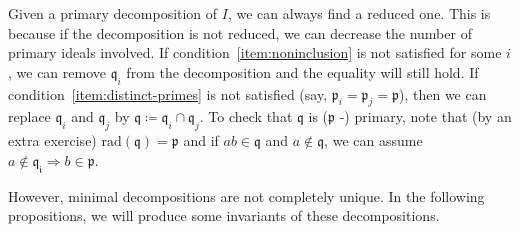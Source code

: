 \begin{rk}
    Given a primary decomposition of $I$, we can always find a reduced one.
    This is because if the decomposition is not reduced,
    we can decrease the number of primary ideals involved.
    If condition~\ref{item:noninclusion} is not satisfied for some $i$,
    we can remove $\mathfrak{q}_i$ from the decomposition and the equality will still hold.
    If condition~\ref{item:distinct-primes} is not satisfied
    (say, $\mathfrak{p}_i = \mathfrak{p}_j = \mathfrak{p}$),
    then we can replace $\mathfrak{q}_i$ and $\mathfrak{q}_j$ by
    $\mathfrak{q} \coloneqq \mathfrak{q}_i \cap \mathfrak{q}_j$.
    To check that $\mathfrak{q}$ is ($\mathfrak{p}$ -) primary,
    note that (by an extra exercise) $\text{rad}(\mathfrak{q}) = \mathfrak{p}$
    and if $ab \in \mathfrak{q}$ and $a \notin \mathfrak{q}$,
    we can assume $a \notin \mathfrak{q_i} \Rightarrow b \in \mathfrak{p}$.
\end{rk}

\begin{rk}
    However, minimal decompositions are not completely unique.
    In the following propositions, we will produce some invariants of these decompositions.
\end{rk}
